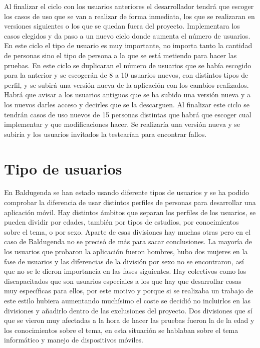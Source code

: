 Al finalizar el ciclo con los usuarios anteriores el desarrollador tendrá que escoger los casos de uso que se van a realizar de forma inmediata, los que se realizaran en versiones siguientes o los que se quedan fuera del proyecto.
Implementara los casos elegidos y da paso a un nuevo ciclo donde aumenta el número de usuarios.
En este ciclo el tipo de usuario es muy importante, no importa tanto la cantidad de personas sino el tipo de persona a la que se está metiendo para hacer las pruebas.
En este ciclo se duplicaran el número de usuarios que se había escogido para la anterior y se escogerán de 8 a 10 usuarios nuevos, con distintos tipos de perfil, y se subirá una versión nueva de la aplicación con los cambios realizados.
Habrá que avisar a los usuarios antiguos que se ha subido una versión nueva y a los nuevos darles acceso y decirles que se la descarguen.
Al finalizar este ciclo se tendrán casos de uso nuevos de 15 personas distintas que habrá que escoger cual implementar y que modificaciones hacer.
Se realizaría una versión nueva y se subiría y los usuarios invitados la testearían para encontrar fallos.


\section{Tipo de usuarios}
\label{secc:tipo de usuarios}

En Baldugenda se han estado usando diferente tipos de usuarios y se ha podido comprobar la diferencia de usar distintos perfiles de personas para desarrollar una aplicación móvil.
Hay distintos ámbitos que separan los perfiles de los usuarios, se pueden dividir por edades, también por tipos de estudios, por conocimientos sobre el tema, o por sexo.
Aparte de esas divisiones hay muchas otras pero en el caso de Baldugenda no se precisó de más para sacar conclusiones.
La mayoría de los usuarios que probaron la aplicación fueron hombres, hubo dos mujeres en la fase de usuarios y las diferencias de la división por sexo no se encontraron, así que no se le dieron importancia en las fases siguientes.
Hay colectivos como los discapacitados que son usuarios especiales a los que hay que desarrollar cosas muy específicas para ellos, por este motivo y porque si se realizaba un trabajo de este estilo hubiera aumentando muchísimo el coste se decidió no incluirlos en las divisiones y añadirlo dentro de las exclusiones del proyecto.
Dos divisiones que sí que se vieron muy afectadas a la hora de hacer las pruebas fueron la de la edad y los conocimientos sobre el tema, en esta situación se hablaban sobre el tema informático y manejo de dispositivos móviles.

